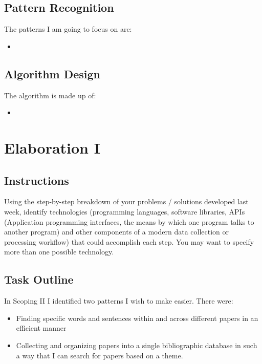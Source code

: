 \documentclass{article}
\begin{document}
\subsection{Pattern Recognition}

The patterns I am going to focus on are:

\begin{itemize}
    \item

\end{itemize}

\subsection{Algorithm Design}

The algorithm is made up of:

\begin{itemize}
    \item

\end{itemize}


\section{Elaboration I}

\subsection{Instructions}

Using the step-by-step breakdown of your problems / solutions developed last week, identify technologies (programming languages, software libraries, APIs (Application programming interfaces, the means by which one program talks to another program) and other components of a modern data collection or processing workflow) that could accomplish each step. You may want to specify more than one possible technology.

\subsection{Task Outline}

\noindent
In Scoping II I identified two patterns I wish to make easier. There were:

\begin{itemize}
    \item Finding specific words and sentences within and across different papers in an efficient manner
    \item Collecting and organizing papers into a single bibliographic database in such a way that I can search for papers based on a theme.

\end{itemize}
\end{document}
